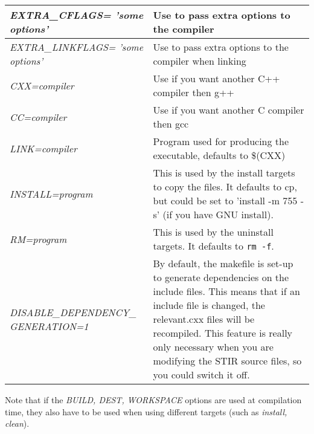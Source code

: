 \documentclass{article}
\begin{document}
\begin{longtable}{|p{\MakeTableFirstCol}|p{\MakeTableSecondCol}|}
{\raggedright
\textit{EXTRA\_CFLAGS= \linebreak
'some options'}} & 

{\raggedright
Use to pass extra options to the compiler} \\
\hline

{\raggedright
\textit{EXTRA\_LINKFLAGS= \linebreak
'some options'}} & 

{\raggedright
Use to pass extra options to the compiler when linking} \\
\hline

{\raggedright
\textit{CXX=compiler}} & 

{\raggedright
Use if you want another C++ compiler then g++} \\
\hline

{\raggedright
\textit{CC=compiler}} & 

{\raggedright
Use if you want another C compiler then gcc} \\
\hline

{\raggedright
\textit{LINK=compiler}} & 

{\raggedright
Program used for producing the executable, defaults to \$(CXX)} \\
\hline

{\raggedright
\textit{INSTALL=program}} & 

{\raggedright
This is used by the install targets to copy the files. It defaults 
to cp, but could be set to 'install -m 755 -s' (if you have GNU 
install).} \\
\hline

{\raggedright
\textit{RM=program}} & 

{\raggedright
This is used by the uninstall targets. It defaults to \texttt{rm -f}.} \\
\hline

{\raggedright
\textit{DISABLE\_DEPENDENCY\_\linebreak
GENERATION=1}} & 

{\raggedright
By default, the makefile is set-up to generate dependencies 
on the include files. This means that if an include file is changed, 
the relevant.cxx files will be recompiled. This feature is really 
only necessary when you are modifying the STIR source files, 
so you could switch it off.} \\
\hline
\end{longtable}


Note that if the \textit{BUILD, DEST, WORKSPACE} options are used at 
compilation time, they also have to be used when using different 
targets (such as \textit{install, clean}).
\end{document}
